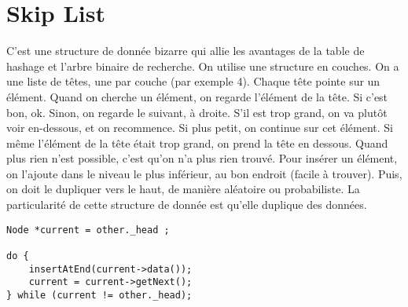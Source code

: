 \documentclass[10pt]{article}
\begin{document}
\section{Skip List}
C'est une structure de donnée bizarre qui allie les avantages de la table de hashage et l'arbre binaire de recherche. On utilise une structure en couches. On a une liste de têtes, une par couche (par exemple 4). Chaque tête pointe sur un élément. Quand on cherche un élément, on regarde l'élément de la tête. Si c'est bon, ok. Sinon, on regarde le suivant, à droite. S'il est trop grand, on va plutôt voir en-dessous, et on recommence. Si plus petit, on continue sur cet élément. 
\newline \newline 
Si même l'élément de la tête était trop grand, on prend la tête en dessous. Quand plus rien n'est possible, c'est qu'on n'a plus rien trouvé. 
\newline \newline 
Pour insérer un élément, on l'ajoute dans le niveau le plus inférieur, au bon endroit (facile à trouver). Puis, on doit le dupliquer vers le haut, de manière aléatoire ou probabiliste. 
\newline \newline 
La particularité de cette structure de donnée est qu'elle duplique des données.  
\lstset{language=C++}
\lstset{basicstyle=\footnotesize}
\begin{lstlisting}
Node *current = other._head ;  

do {
    insertAtEnd(current->data()); 
    current = current->getNext(); 
} while (current != other._head);
\end{lstlisting}
\end{document}
